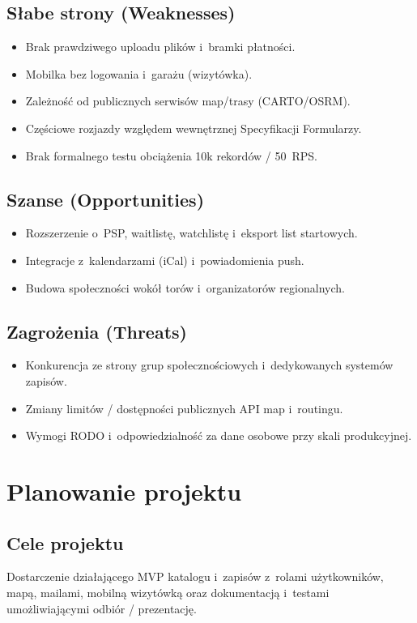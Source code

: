 \documentclass{sprz}
\begin{document}
\section{Słabe strony (Weaknesses)}  
\begin{itemize}  
 \item Brak prawdziwego uploadu plików i~bramki płatności.  
 \item Mobilka bez logowania i~garażu (wizytówka).  
 \item Zależność od publicznych serwisów map/trasy (CARTO/OSRM).  
 \item Częściowe rozjazdy względem wewnętrznej Specyfikacji Formularzy.  
 \item Brak formalnego testu obciążenia 10k rekordów / 50~RPS.  
\end{itemize}  
  
\section{Szanse (Opportunities)}  
\begin{itemize}  
 \item Rozszerzenie o~PSP, waitlistę, watchlistę i~eksport list startowych.  
 \item Integracje z~kalendarzami (iCal) i~powiadomienia push.  
 \item Budowa społeczności wokół torów i~organizatorów regionalnych.  
\end{itemize}  
  
\section{Zagrożenia (Threats)}  
\begin{itemize}  
 \item Konkurencja ze strony grup społecznościowych i~dedykowanych systemów zapisów.  
 \item Zmiany limitów / dostępności publicznych API map i~routingu.  
 \item Wymogi RODO i~odpowiedzialność za dane osobowe przy skali produkcyjnej.  
\end{itemize}  
  
\chapter{Planowanie projektu}  
\section{Cele projektu}  
Dostarczenie działającego MVP katalogu i~zapisów z~rolami użytkowników, mapą, mailami, mobilną wizytówką oraz dokumentacją i~testami umożliwiającymi odbiór / prezentację.  
  
\end{document}
